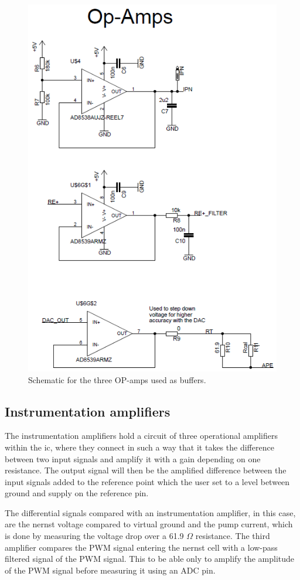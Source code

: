 \begin{figure}
    \centering
    \includegraphics[width=.7\textwidth]{Chapter3/Figures/OPamp_schematic.png}
    \caption{Schematic for the three OP-amps used as buffers.}
    \label{fig:OPamp_schematic}
\end{figure}


\subsection{Instrumentation amplifiers}

The instrumentation amplifiers hold a circuit of three operational amplifiers within the \ac{ic}, where they connect in such a way that it takes the difference between two input signals and amplify it with a gain depending on one resistance. The output signal will then be the amplified difference between the input signals added to the reference point which the user set to a level between ground and supply on the reference pin.

The differential signals compared with an instrumentation amplifier, in this case, are the nernst voltage compared to virtual ground and the pump current, which is done by measuring the voltage drop over a 61.9 $\Omega$ resistance. The third amplifier compares the PWM signal entering the nernst cell with a low-pass filtered signal of the PWM signal. This to be able only to amplify the amplitude of the PWM signal before measuring it using an ADC pin.

